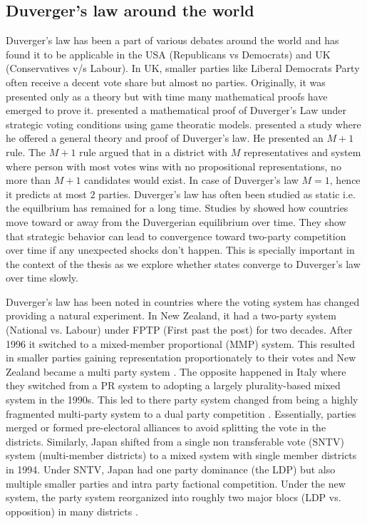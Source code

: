 \subsection{Duverger's law around the world}
Duverger's law has been a part of various debates around the world and has found it to be applicable in the USA (Republicans vs Democrats) and UK (Conservatives v/s Labour). In UK, smaller parties like Liberal Democrats Party often receive a decent vote share but almost no parties. Originally, it was presented only as a theory but with time many mathematical proofs have emerged to prove it. \cite{palfrey1989mathematical} presented a mathematical proof of Duverger’s Law under strategic voting conditions using game theoratic models. \cite{cox1997making} presented a study where he offered a general theory and proof of Duverger's law. He presented an $M+1$ rule. The $M+1$ rule argued that in a district with $M$ representatives and system where person with most votes wins with no propositional representations, no more than $M+1$ candidates would exist. In case of Duverger's law $M=1$, hence it predicts at most $2$ parties. Duverger's law has often been studied as static i.e. the equilbrium has remained for a long time. Studies by \cite{forand2015dynamic} showed how  countries move toward or away from the Duvergerian equilibrium over time.  They show that strategic behavior can lead to convergence toward two-party competition over time if any unexpected shocks don't happen. This is specially important in the context of the thesis as we explore whether states converge to Duverger's law over time slowly. 

\vspace{0.3cm}

Duverger's law has been noted in countries where the voting system has changed providing a natural experiment. In New Zealand, it had a two-party system (National vs. Labour) under FPTP (First past the post) for two decades. After 1996 it switched to a mixed-member proportional (MMP) system. This resulted in smaller parties gaining representation proportionately to their votes and New Zealand became a multi party system \citep{Eberhard_2017}. The opposite happened in Italy where they switched from a PR system to  adopting a largely plurality-based mixed system in the 1990s. This led to there party system changed from being a highly fragmented multi-party system to a dual party competition \citep{reed2001duverger}. Essentially, parties merged or formed pre-electoral alliances to avoid splitting the vote in the districts. Similarly,  Japan shifted from a single non transferable vote (SNTV) system (multi-member districts) to a mixed system with single member districts in 1994. Under SNTV, Japan had one party dominance (the LDP) but also multiple smaller parties and intra party factional competition. Under the new system, the party system reorganized into roughly two major blocs (LDP vs. opposition) in many districts \citep{reed2007duverger}. 


